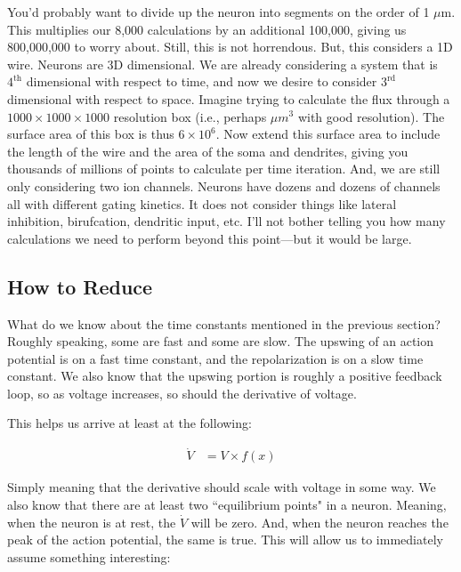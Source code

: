\documentclass[12pt]{report}
\begin{document}
You'd probably want to divide up the neuron into segments on the order of 1 $\mu$m. This multiplies our 8,000 calculations by an additional 100,000, giving us 800,000,000 to worry about. Still, this is not horrendous. But, this considers a 1D wire. Neurons are 3D dimensional. We are already considering a system that is $4^{\mathrm{th}}$ dimensional with respect to time, and now we desire to consider $3^{\mathrm{rd}}$ dimensional with respect to space. Imagine trying to calculate the flux through a $1000 \times 1000 \times 1000$ resolution box (i.e., perhaps $\mu m^3$ with good resolution). The surface area of this box is thus $6\times 10^6$. Now extend this surface area to include the length of the wire and the area of the soma and dendrites, giving you thousands of millions of points to calculate per time iteration. And, we are still only considering two ion channels. Neurons have dozens and dozens of channels all with different gating kinetics. It does not consider things like lateral inhibition, birufcation, dendritic input, etc. I'll not bother telling you how many calculations we need to perform beyond this point---but it would be large. 

\subsection{How to Reduce} What do we know about the time constants mentioned in the previous section? Roughly speaking, some are fast and some are slow. The upswing of an action potential is on a fast time constant, and the repolarization is on a slow time constant. We also know that the upswing portion is roughly a positive feedback loop, so as voltage increases, so should the derivative of voltage.\newline

This helps us arrive at least at the following: 

\begin{equation} \label{fn1}
\begin{split}
\dot{V} &= V \times f(x)
\end{split}
\end{equation}


Simply meaning that the derivative should scale with voltage in some way. We also know that there are at least two ``equilibrium points" in a neuron. Meaning, when the neuron is at rest, the $\dot{V}$ will be zero. And, when the neuron reaches the peak of the action potential, the same is true. This will allow us to immediately assume something interesting:
\end{document}
